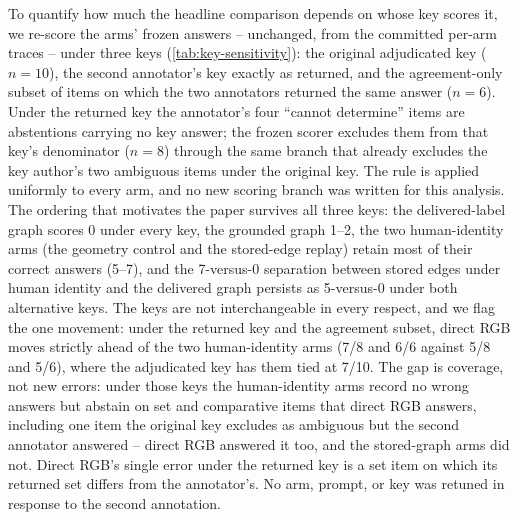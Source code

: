 To quantify how much the headline comparison depends on whose key scores it,
we re-score the arms' frozen answers -- unchanged, from the committed
per-arm traces -- under three keys (\cref{tab:key-sensitivity}): the original
adjudicated key ($n{=}10$), the second annotator's key exactly as returned,
and the agreement-only subset of items on which the two annotators returned
the same answer ($n{=}6$). Under the returned key the annotator's four
``cannot determine'' items are abstentions carrying no key answer; the frozen
scorer excludes them from that key's denominator ($n{=}8$) through the same
branch that already excludes the key author's two ambiguous items under the
original key. The rule is applied uniformly to every arm, and no new scoring
branch was written for this analysis. The ordering that motivates the paper
survives all three keys: the delivered-label graph scores 0 under every key,
the grounded graph 1--2, the two human-identity arms (the geometry control
and the stored-edge replay) retain most of their correct answers (5--7), and
the 7-versus-0 separation between stored edges under human identity and the
delivered graph persists as 5-versus-0 under both alternative keys. The keys are not interchangeable in every
respect, and we flag the one movement: under the returned key and the
agreement subset, direct RGB moves strictly ahead of the two human-identity
arms (7/8 and 6/6 against 5/8 and 5/6), where the adjudicated key has them
tied at 7/10. The gap is coverage, not new errors: under those keys the
human-identity arms record no wrong answers but abstain on set and
comparative items that direct RGB answers, including one item the original
key excludes as ambiguous but the second annotator answered -- direct RGB
answered it too, and the stored-graph arms did not. Direct RGB's single error
under the returned key is a set item on which its returned set differs from
the annotator's. No arm, prompt, or key was retuned in response to the second
annotation.

